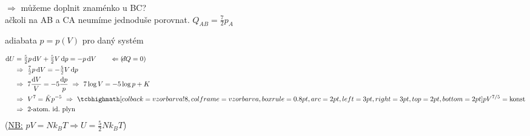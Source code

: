 $\Rightarrow$ můžeme doplnit znaménko u BC? \\ ačkoli na AB a CA neumíme jednoduše porovnat. \quad \sout{$Q_{AB} = \frac72 p_A$}

\begin{priklad}[Př.\ 3]
adiabata $p = p(V)$ pro daný systém
\end{priklad}
\begin{align*}
  \dd U &= \tfrac52 p\,\dd V + \tfrac52 V\,\dd p = -p\,\dd V \qquad \Leftarrow (\dbar Q = 0) \\
  &\Rightarrow\ \tfrac72 p\,\dd V = -\tfrac52 V\,\dd p \\
  &\Rightarrow\ 7\frac{\dd V}{V} = -5\frac{\dd p}{p} \ \Rightarrow\ 7\log V = -5\log p + K \\
  &\Rightarrow\ V^7 = \tilde Kp^{-5} \ \Rightarrow\ \vzorec{pV^{7/5} = \text{konst}} \\
  &\Rightarrow\ \text{2-atom.\ id.\ plyn}
\end{align*}
(\underline{NB:} $pV = Nk_BT \Rightarrow U = \frac52 Nk_BT$)


